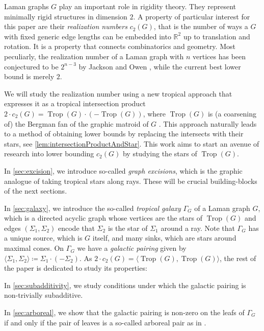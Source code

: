 \documentclass[11pt,reqno,a4paper]{amsart}
\theoremstyle{theoremstyle}
\theoremstyle{examplestyle}
\theoremstyle{algorithmstyle}
\newcommand{\yue}[1]{\textcolor{red!50!black}{#1}}
\newcommand{\RR}{\mathbb{R}}
\DeclareMathOperator{\Trop}{Trop}
\begin{document}
Laman graphs $G$ play an important role in rigidity theory. They represent minimally rigid structures in dimension $2$.  A property of particular interest for this paper are their \emph{realization numbers} $c_2(G)$, that is the number of ways a $G$ with fixed generic edge lengths can be embedded into $\RR^2$ up to translation and rotation.  It is a property that connects combinatorics and geometry.  Most peculiarly, the realization number of a Laman graph with $n$ vertices has been conjectured to be $2^{n-3}$ by Jackson and Owen \cite{JacksonOwen2019}, while the current best lower bound is merely $2$. %

We will study the realization number using a new tropical approach that expresses it as a tropical intersection product $2\cdot c_2(G)=\Trop(G)\cdot (-\Trop(G))$, where $\Trop(G)$ is (a coarsening of) the Bergman fan of the graphic matroid of $G$ \cite{ClarkeDewarTrippMaxwellNixonRenSmith2025}.  This approach naturally leads to a method of obtaining lower bounds by replacing the intersects with their stars, see \cref{lem:intersectionProductAndStar}.  This work aims to start an avenue of research into lower bounding $c_2(G)$ by studying the stars of $\Trop(G)$.

In \cref{sec:excision}, we introduce so-called \emph{graph excisions}, which is the graphic analogue of taking tropical stars along rays.  These will be crucial building-blocks of the next sections.

In \cref{sec:galaxy}, we introduce the so-called \emph{tropical galaxy} $\Gamma_G$ of a Laman graph $G$, which is a directed acyclic graph whose vertices are the stars of $\Trop(G)$ and edges $(\Sigma_1,\Sigma_2)$ encode that $\Sigma_2$ is the star of $\Sigma_1$ around a ray.  Note that $\Gamma_G$ has a unique source, which is $G$ itself, and many sinks, which are stars around maximal cones. On $\Gamma_G$ we have a \emph{galactic pairing} given by $\langle \Sigma_1,\Sigma_2\rangle\coloneqq \Sigma_1\cdot(-\Sigma_2)$.  As $2\cdot c_2(G)=\langle \Trop(G),\Trop(G)\rangle$, the rest of the paper is dedicated to study its properties:

In \cref{sec:subadditivity}, we study conditions under which the galactic pairing is non-trivially subadditive.

In \cref{sec:arboreal}, we show that the galactic pairing is non-zero on the leafs of $\Gamma_G$ if and only if the pair of leaves is a so-called arboreal pair as in \cite{Ardila-MantillaEurPenaguiao2024}.
\end{document}
